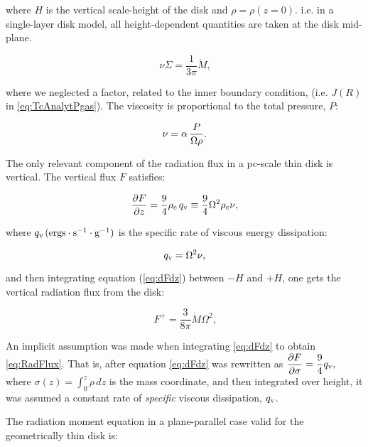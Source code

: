 \documentclass[12pt,english,preprint]{aastex}
\newcommand{\su}[2]{#1_{\rm #2}}
\begin{document}
\noindent where $H$ is the vertical scale-height of the disk and $\rho=\rho(z=0)$.
i.e. in a single-layer disk model, all height-dependent quantities are taken at the
disk mid-plane.

\begin{equation}
\nu\Sigma=\frac{1}{3\pi}\dot{M}\mbox{,}\label{eq:AngMom}
\end{equation}

\noindent where we neglected a factor, related to the inner boundary condition,
(i.e. $J(R)$ in \eqref{eq:TcAnalytPgas}).
The viscosity is proportional to the total pressure, $P$:

\begin{equation}
  \nu=\alpha\,\frac{P}{\text{\ensuremath{\Omega\rho}}}\mbox{.}
  \label{eq:defNuAlphaPtot}    
\end{equation}

\noindent The only relevant component of the radiation flux in a pc-scale thin disk
is vertical. 
The vertical flux $F$ satisfies: 

\begin{equation}
\frac{\partial F}{\partial z}=\frac{9}{4}\rho_c
\,q_{{\rm v}}\equiv\frac{9}{4}\Omega^{2}\rho_c\nu\mbox{,}\label{eq:dFdz}
\end{equation}

\noindent where $q_{{\rm v}}$$({\rm ergs\cdot s^{-1}\cdot g^{-1}})$ is the
specific rate of viscous energy dissipation: 

\begin{equation}
\su{q}{v}=\Omega^{2}\nu\mbox{,}\label{eq:qv(specific)}
\end{equation}

\noindent and then integrating equation (\ref{eq:dFdz}) between $-H$ and
$+H$, one gets the vertical radiation flux from the disk:

\begin{equation}
F^{+}=\frac{3}{8\pi}\dot{M}\Omega^{2}\mbox{,}\label{eq:RadFlux}
\end{equation}

\noindent An implicit assumption was made when integrating \eqref{eq:dFdz} to obtain \eqref{eq:RadFlux}. That is,
after equation \eqref{eq:dFdz} was rewritten as
${\displaystyle \frac{\partial F}{\partial\sigma}=\frac{9}{4}q_{{\rm v}}},$
where ${\displaystyle \sigma(z)=\int_{0}^{z}\rho\,dz}$ is the mass
coordinate, and then integrated over height, it was assumed a constant rate of \emph{specific} viscous dissipation, $\su{q}{v}$. 

The radiation moment equation in
a plane-parallel case valid for the geometrically thin disk is:
\end{document}
